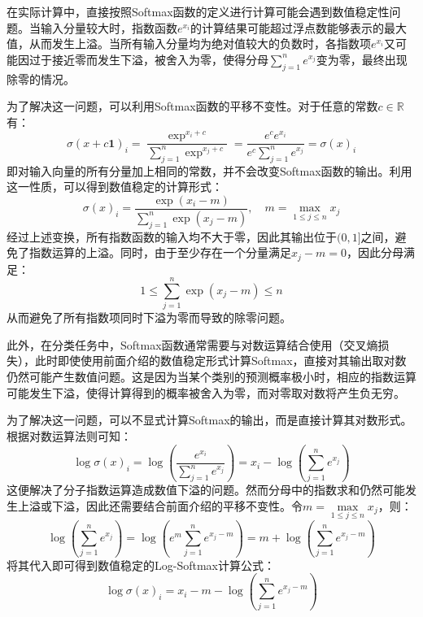 \begin{note}
	在实际计算中，直接按照Softmax函数的定义进行计算可能会遇到数值稳定性问题。当输入分量较大时，指数函数$e^{x_i}$的计算结果可能超过浮点数能够表示的最大值，从而发生上溢。当所有输入分量均为绝对值较大的负数时，各指数项$e^{x_i}$又可能因过于接近零而发生下溢，被舍入为零，使得分母$\sum\limits_{j=1}^ne^{x_j}$变为零，最终出现除零的情况。\par
	为了解决这一问题，可以利用Softmax函数的平移不变性。对于任意的常数$c\in\mathbb{R}$有：
	\begin{equation*}
		\sigma(x+c\mathbf{1})_i=\frac{\exp^{x_i+c}}{\sum\limits_{j=1}^n\exp^{x_j+c}}=\frac{e^ce^{x_i}}{e^c\sum\limits_{j=1}^ne^{x_j}}=\sigma(x)_i
	\end{equation*}
	即对输入向量的所有分量加上相同的常数，并不会改变Softmax函数的输出。利用这一性质，可以得到数值稳定的计算形式：
	\begin{equation*}
		\sigma(x)_i=\frac{\exp(x_i-m)}{\sum\limits_{j=1}^n\exp(x_j-m)},\quad m=\max_{1\leqslant j\leqslant n}x_j
	\end{equation*}
	经过上述变换，所有指数函数的输入均不大于零，因此其输出位于$(0,1]$之间，避免了指数运算的上溢。同时，由于至少存在一个分量满足$x_j-m=0$，因此分母满足：
	\begin{equation*}
		1\leqslant\sum_{j=1}^n\exp(x_j-m)\leqslant n
	\end{equation*}
	从而避免了所有指数项同时下溢为零而导致的除零问题。\par
	此外，在分类任务中，Softmax函数通常需要与对数运算结合使用（交叉熵损失），此时即使使用前面介绍的数值稳定形式计算Softmax，直接对其输出取对数仍然可能产生数值问题。这是因为当某个类别的预测概率极小时，相应的指数运算可能发生下溢，使得计算得到的概率被舍入为零，而对零取对数将产生负无穷。\par
	为了解决这一问题，可以不显式计算Softmax的输出，而是直接计算其对数形式。根据对数运算法则可知：
	\begin{equation*}
		\log\sigma(x)_i=\log\left(\frac{e^{x_i}}{\sum\limits_{j=1}^ne^{x_j}}\right)=x_i-\log\left(\sum\limits_{j=1}^ne^{x_j}\right)
	\end{equation*}
	这便解决了分子指数运算造成数值下溢的问题。然而分母中的指数求和仍然可能发生上溢或下溢，因此还需要结合前面介绍的平移不变性。令$m=\max\limits_{1\leqslant j\leqslant n}x_j$，则：
	\begin{equation*}
		\log\left(\sum_{j=1}^ne^{x_j}\right)=\log\left(e^m\sum_{j=1}^ne^{x_j-m}\right)=m+\log\left(\sum_{j=1}^ne^{x_j-m}\right)
	\end{equation*}
	将其代入即可得到数值稳定的Log-Softmax计算公式：
	\begin{equation*}
		\log\sigma(x)_i=x_i-m-\log\left(\sum_{j=1}^ne^{x_j-m}\right)
	\end{equation*}
\end{note}

